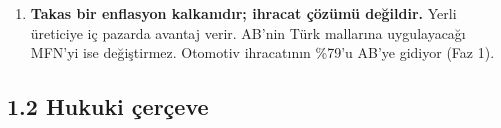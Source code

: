 \begin{enumerate}
  \begin{itemize}
  \tightlist
  \item
    yerli ürün AB ürününe göre tarife kadar ucuzlar;
  \item
    grubun ortalama fiyatı değişmez;
  \item
    mali maliyet küçüktür, çünkü tarife geliri indirimi büyük ölçüde finanse eder.
  \end{itemize}
\item
  \textbf{Takas bir enflasyon kalkanıdır; ihracat çözümü değildir.} Yerli üreticiye iç pazarda avantaj verir. AB'nin Türk mallarına uygulayacağı MFN'yi ise değiştirmez. Otomotiv ihracatının \%79'u AB'ye gidiyor (Faz 1).
\end{enumerate}

\hypertarget{02a_politika_uzayi-12-hukuki-uxe7eruxe7eve}{%
\subsection{1.2 Hukuki çerçeve}\label{02a_politika_uzayi-12-hukuki-uxe7eruxe7eve}}

\begingroup\gbtablo\small

